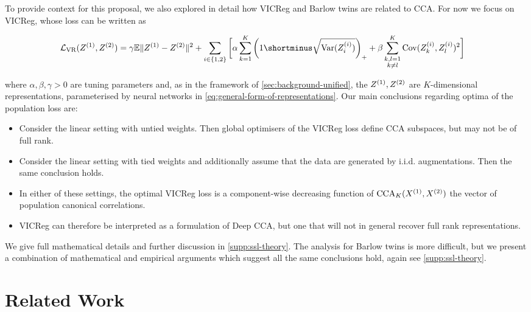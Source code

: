 To provide context for this proposal, we also explored in detail how VICReg and Barlow twins are related to CCA.
For now we focus on VICReg, whose loss can be written as
\begin{small}\begin{align*}
    \mathcal{L}_\text{VR}(Z\sps{1}, Z\sps{2})
    &= \gamma \mathbb{E} \norm{Z^{(1)} - Z^{(2)}}^2 + \sum_{i \in \{1,2\}} \bigg[\alpha \sum_{k=1}^K \left(1 \shortminus \sqrt{\Var(Z\sps{i}_i)}\right)_+ + \beta \sum_{\substack{k,l=1 \\ k \neq l}}^K \Cov(Z\sps{i}_k,Z\sps{i}_l)^2 \bigg]
\end{align*}\end{small}%
where $\alpha, \beta, \gamma > 0$ are tuning parameters and, as in the framework of \cref{sec:background-unified}, the $Z^{(1)}, Z^{(2)}$ are $K$-dimensional representations, parameterised by neural networks in \cref{eq:general-form-of-representations}.
Our main conclusions regarding optima of the population loss are:
\begin{itemize}
    \item Consider the linear setting with untied weights. Then global optimisers of the VICReg loss define CCA subspaces, but may not be of full rank.
    \item Consider the linear setting with tied weights and additionally assume that the data are generated by i.i.d. augmentations. Then the same conclusion holds.
    \item In either of these settings, the optimal VICReg loss is a component-wise decreasing function of $\operatorname{CCA}_K(X^{(1)}, X^{(2)})$ the vector of population canonical correlations.
    \item VICReg can therefore be interpreted as a formulation of Deep CCA, but one that will not in general recover full rank representations.
\end{itemize}

We give full mathematical details and further discussion in \cref{supp:ssl-theory}.
The analysis for Barlow twins is more difficult, but we present a combination of mathematical and empirical arguments which suggest all the same conclusions hold, again see \cref{supp:ssl-theory}.

\section{Related Work}\label{sec:related-work}

